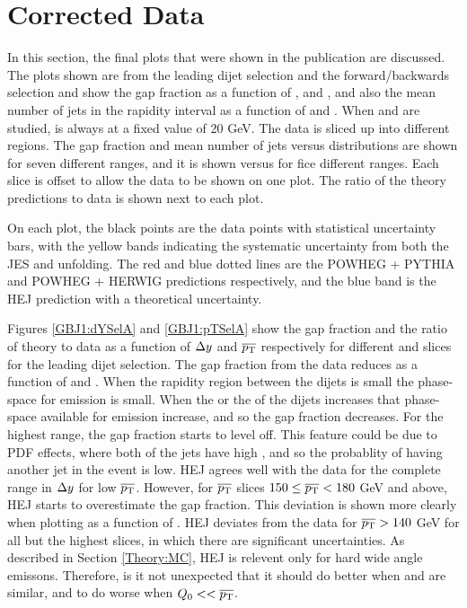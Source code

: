 \section{Corrected Data}
\label{sec:GBJ1:FinalPlots}

In this section, the final plots that were shown in the publication are discussed. 
The plots shown are from  the leading \pt{} dijet selection and the forward/backwards selection and show the gap fraction as a function of \dy{}, \ptb{} and \qz{}, and also the mean number of jets in the rapidity interval as a function of \dy{} and \ptb{}. 
When \dy{} and \ptb{} are studied, \qz{} is always at a fixed value of 20 GeV. 
The data is sliced up into different regions. 
The gap fraction and mean number of jets versus \dy{} distributions are shown for seven different \ptb{} ranges, and it is shown versus \ptb{} for fice different \dy{} ranges. 
Each slice is offset to allow the data to be shown on one plot. 
The ratio of the theory predictions to data is shown next to each plot.

On each plot, the black points are the data points with statistical uncertainty bars, with the yellow bands indicating the systematic uncertainty from both the JES and unfolding. 
The red and blue dotted lines are the POWHEG + PYTHIA and POWHEG + HERWIG predictions respectively, and the blue band is the HEJ prediction with a theoretical uncertainty.

Figures \ref{GBJ1:dYSelA} and \ref{GBJ1:pTSelA} show the gap fraction and the ratio of theory to data as a function of $\mbox{$\Delta y$}{}$ and $\mbox{$\overline{p_{\rm T}}$}{}$ respectively for different \ptb{} and \dy{} slices for the leading \pt{} dijet selection. 
The gap fraction from the data reduces as a function of \ptb{} and \dy{}.
When the rapidity region between the dijets is small the phase-space for emission is small. 
When the \dy{} or the \ptb{} of the dijets increases that phase-space available for emission increase, and so the gap fraction decreases.
For the highest \ptb{} range, the gap fraction starts to level off. 
This feature could be due to PDF effects, where both of the jets have high \pt{}, and so the probablity of having another jet in the event is low.
HEJ agrees well with the data for the complete range in $\mbox{$\Delta y$}$ for low $\mbox{$\overline{p_{\rm T}}$}{}$. 
However, for $\mbox{$\overline{p_{\rm T}}$}{}$ slices $150\le\mbox{$\overline{p_{\rm T}}$}{}<180$ GeV and above, HEJ starts to overestimate the gap fraction.
This deviation is shown more clearly when plotting as a function of \ptb{}.
HEJ deviates from the data for $\mbox{$\overline{p_{\rm T}}$}{}>140$ GeV for all but the highest \dy{} slices, in which there are significant uncertainties.
As described in Section \ref{Theory:MC}, HEJ is relevent only for hard wide angle emissons.
Therefore, is it not unexpected that it should do better when \qz{} and \ptb{} are similar, and to do worse when $Q_{0}<<\mbox{$\overline{p_{\rm T}}$}{}$.

